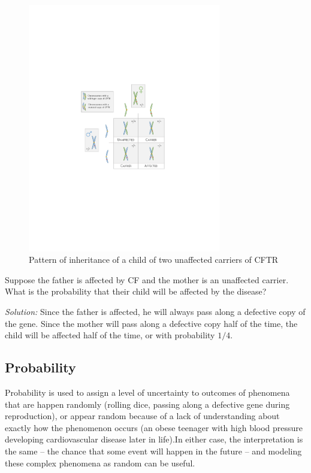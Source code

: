 \begin{figure}
\includegraphics[width= 0.75\textwidth]{./figures/cfInheritance/cfInheritance.pdf}
\caption{Pattern of inheritance of a child of two unaffected carriers of CFTR}
\label{fig:cfInheritance}
\end{figure}


\begin{exercise}
Suppose the father is affected by CF and the mother is an unaffected carrier.  What is the probability that their child will be affected by the disease?

\textit{Solution:}  Since the father is affected, he will always pass along a defective copy of the gene.  Since the mother will pass along a defective copy half of the time, the child will be affected half of the time, or with probability $1/4$.

\end{exercise}

\subsection{Probability}


Probability is used to assign a level of uncertainty to outcomes of phenomena that are happen randomly (rolling dice, passing along a defective gene during reproduction), or appear random because of a lack of understanding about exactly  how the phenomenon occurs (an obese teenager with high blood pressure developing cardiovascular disease later in life).In either case, the interpretation is the same -- the chance that some event will happen in the future -- and modeling these complex phenomena as random can be useful.

